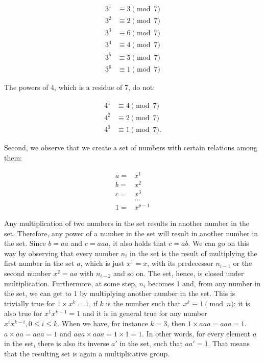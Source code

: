 \documentclass{scrreprt}
\begin{document}
\begin{align*}
3^1 & \equiv 3 \pmod{7}\\
3^2 & \equiv 2 \pmod{7}\\
3^3 & \equiv 6 \pmod{7}\\
3^4 & \equiv 4 \pmod{7}\\
3^5 & \equiv 5 \pmod{7}\\
3^6 & \equiv 1 \pmod{7}
\end{align*}

The powers of 4, which is a residue of 7, do not:

\begin{align*}
4^1 & \equiv 4 \pmod{7}\\
4^2 & \equiv 2 \pmod{7}\\
4^3 & \equiv 1 \pmod{7}.
\end{align*}

Second, we observe that we
create a set of numbers
with certain relations among them:

\begin{align*}
a = & x^1\\
b = & x^2\\
c = & x^3\\
    & \dots\\
1 = & x^{p-1}
\end{align*}

Any multiplication of two numbers
in the set results in another number in the set.
Therefore, any power of a number in the set
will result in another number in the set.
Since $b = aa$ and $c = aaa$, it also holds
that $c = ab$. We can go on this way
by observing that every number $n_i$ in the set 
is the result of multiplying the first
number in the set $a$, which is just $x^1 = x$,
with its predecessor $n_{i-1}$ or
the second number $x^2 = aa$ with $n_{i-2}$
and so on.
The set, hence, is closed under multiplication.
Furthermore, at some step, $n_i$ becomes 1
and, from any number in the set,
we can get to 1 by multiplying another number
in the set.
This is trivially true for $1 \times x^k = 1$,
if $k$ is the number such that $x^k \equiv 1 \pmod{n}$;
it is also true for $x^1x^{k-1} = 1$ and
it is in general true for any number 
$x^ix^{k-i}, 0\le i\le k$.
When we have, for instance $k=3$, then
$1 \times aaa = aaa = 1$.
$a \times aa = aaa = 1$ and
$aaa \times aaa = 1 \times 1 = 1$.
In other words, for every element $a$ in the set,
there is also its inverse $a'$ in the set,
such that $aa' = 1$.
That means that the resulting set
is again a multiplicative group.
\end{document}
